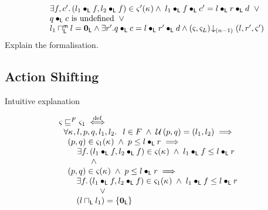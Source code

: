 \begin{definition}
\[\begin{array}{l}
  \hspace*{0.4cm}\exists f, c'.\, (l_1 \bullet_{\textsf{L}} f, l_2 \bullet_{\textsf{L}} f) \in \varsigma_{}'(\kappa_{}) \land\; l_1 \bullet_{\textsf{L}} f \bullet_{\textsf{L}} c' =  l \bullet_{\textsf{L}} r \bullet_{\textsf{L}} d \;\;\lor\\
	

		\hspace*{0.4cm}q \bullet_{\textsf{L}} c \text{ is undefined} \;\;\lor\\
		\hspace*{0.4cm}l_1 \sqcap_{\textsf{L}}^{\textsf{m}} l = \mathbf{0}_{\textsf{L}} \land \exists r'.\,\! q \bullet_{\textsf{L}} c = l \bullet_{\textsf{L}} r' \bullet_{\textsf{L}} d \land \left(\varsigma_{}, \varsigma_{L}\right) \!\downarrow_{(n-1)} \left(l, r', \varsigma_{}'\right)

\end{array}
\]
%
\todo Explain the formalisation.
\end{definition}
%
%
%
%
\subsection{Action Shifting}
\todo Intuitive explanation
\begin{definition}
%
\[
\begin{array}{l}
	\varsigma_{} \sqsubseteq^{F}  \varsigma_{1} \stackrel{\mathrm{def}}{\iff} \\
	\hspace*{0.2cm}\forall \kappa_{}, l, p, q, l_1, l_2.\,\;\; l \in F \;\land\; \mathcal{U}\left(p, q\right) = (l_1, l_2) \implies\\
	\hspace*{0.2cm}
	\begin{array}{l}
		(p, q) \in \varsigma_{1}(\kappa_{}) 
		\;\land\; p \leq l \bullet_{\textsf{L}} r \implies \\
		\hspace*{0.4cm}\exists f.\, (l_1 \bullet_{\textsf{L}} f, l_2 \bullet_{\textsf{L}} f) \in \varsigma_{}(\kappa_{}) \;\land\; l_1 \bullet_{\textsf{L}} f \leq l \bullet_{\textsf{L}} r \\

		\hspace*{1cm} \land\\
		
		(p, q) \in \varsigma_{}(\kappa_{})
		\;\land\; p \leq l \bullet_{\textsf{L}} r \implies \\
		\hspace*{0.2cm}
		\begin{array}{l}
			\exists f.\, (l_1 \bullet_{\textsf{L}} f, l_2 \bullet_{\textsf{L}} f) \in \varsigma_{1}(\kappa_{}) \;\land\; l_1 \bullet_{\textsf{L}} f \leq l \bullet_{\textsf{L}} r \\
			\hspace*{1cm} \lor\\
			\left( l \sqcap_{\textsf{L}} l_1 \right) = \left\{ \mathbf{0}_{\textsf{L}} \right\}
		\end{array}

	\end{array}
\end{array}
\]
%
\end{definition}
